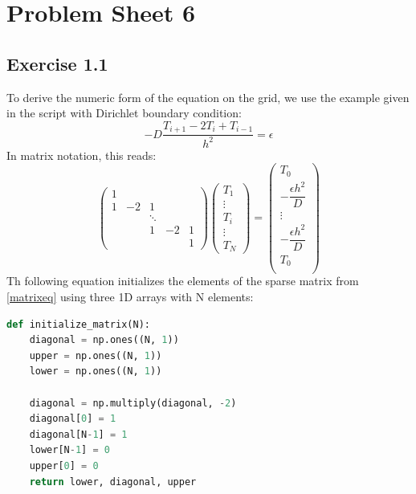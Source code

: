 \documentclass{scrartcl}
\begin{document}
\section*{Problem Sheet 6}
\subsection*{Exercise 1.1}
To derive the numeric form of the equation on the grid, we use the example given in the script with Dirichlet boundary condition:
\begin{equation}
	-D \dfrac{T_{i+1} - 2 T_{i} + T_{i-1}}{h^2} = \epsilon
\end{equation}
In matrix notation, this reads:
\begin{equation} \label{matrixeq}
	\begin{pmatrix}
	1& \\
	1&-2&1\\
	&&\ddots&\\
	&&1&-2&1\\
	&&&&1
	\end{pmatrix}
	\begin{pmatrix}
	T_1\\
	\vdots\\
	T_i\\
	\vdots\\
	T_{N}
	\end{pmatrix}
	=
	\begin{pmatrix}
	T_0\\
	-\dfrac{\epsilon h^2}{D}\\
	\vdots\\
	-\dfrac{\epsilon h^2}{D}\\
	T_0\\
	\end{pmatrix}
\end{equation}
Th following equation initializes the elements of the sparse matrix from \eqref{matrixeq} using three 1D arrays with N elements:
\begin{lstlisting}[title=Function to initialize the 3D array. Notice that the array for the diagonal part contains one element more than the off diagonal lower and upper part. The corresponding entry in the array is set to one but ignored in any further computation.,  language=Python, frame=single]
def initialize_matrix(N):
	diagonal = np.ones((N, 1))
	upper = np.ones((N, 1))
	lower = np.ones((N, 1))
	
	diagonal = np.multiply(diagonal, -2)
	diagonal[0] = 1
	diagonal[N-1] = 1
	lower[N-1] = 0
	upper[0] = 0
	return lower, diagonal, upper
\end{lstlisting}
\end{document}

